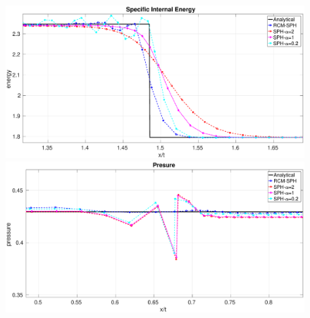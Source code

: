 \documentclass[review]{elsarticle}
\begin{document}
\begin{figure}[htp]
\begin{minipage}{.495 \textwidth}
    \end{minipage}%
    \\
    \begin{minipage}{.495 \textwidth}
        \centering
        \includegraphics[width=0.99 \textwidth]{./Figures/Sod/RCM-Sod-SPH-alf-e-zoom}
    \end{minipage}%
    \begin{minipage}{.495\textwidth}
        \centering
        \includegraphics[width=0.99 \textwidth]{./Figures/Sod/RCM-Sod-SPH-alf-p-zoom}
    \end{minipage}%

\end{figure}
\end{document}
